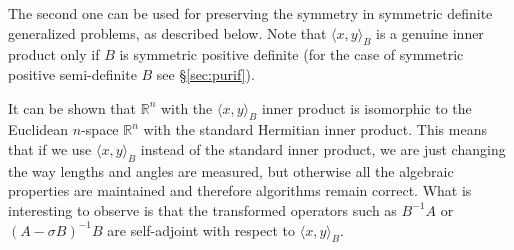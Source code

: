 	The second one can be used for preserving the symmetry in symmetric definite generalized problems, as described below. Note that $\langle x,y\rangle_B$ is a genuine inner product only if $B$ is symmetric positive definite (for the case of symmetric positive semi-definite $B$ see \S\ref{sec:purif}). 

	It can be shown that $\mathbb{R}^n$ with the $\langle x,y\rangle_B$ inner product is isomorphic to the Euclidean $n$-space $\mathbb{R}^n$ with the standard Hermitian inner product. This means that if we use $\langle x,y\rangle_B$ instead of the standard inner product, we are just changing the way lengths and angles are measured, but otherwise all the algebraic properties are maintained and therefore algorithms remain correct. What is interesting to observe is that the transformed operators such as $B^{-1}\!A$ or $(A-\sigma B)^{-1}B$ are self-adjoint with respect to $\langle x,y\rangle_B$.

